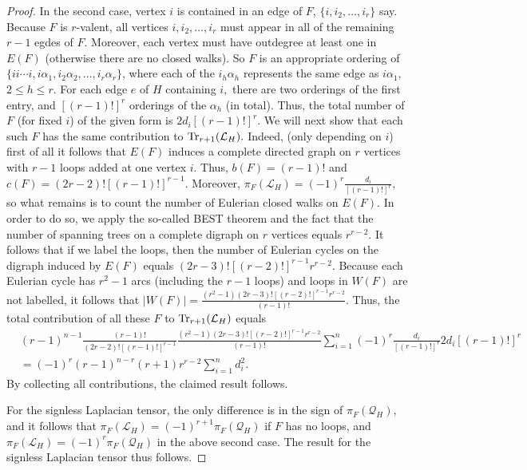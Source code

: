 \documentclass[11pt]{article}
\def\Tr{\mathop{\rm Tr }\nolimits}
\begin{document}
\begin{proof}
In the second case, vertex $i$ is contained in an edge of $F$, $\{i,i_{2},\ldots ,i_{r}\}$ say. Because $F$ is $r$-valent, all vertices $i,i_{2},\ldots ,i_{r}$ must appear in all of the remaining $r-1$ egdes of $F$. Moreover, each vertex must have outdegree at least one in $E(F)$ (otherwise there are no closed walks). So $F$ is an appropriate ordering of $\{ii\cdots i, i\alpha_{1}, i_{2}\alpha_{2}, \ldots, i_{r}\alpha_{r}\}$, where each of the $i_{h}\alpha_{h}$ represents the same edge as $i\alpha_{1}$, $2 \leq h \leq r.$ For each edge $e$ of $H$ containing $i,$ there are two orderings of the first entry, and $[(r-1)!]^{r}$ orderings of the $\alpha_{h}$ (in total). Thus, the total number of $F$ (for fixed $i$) of the given form is $2d_{i}[(r-1)!]^{r}.$ We will next show that each such $F$ has the same contribution to $\Tr_{r+1}(\mathcal{L}_{H}).$ Indeed, (only depending on $i$) first of all it follows that $E(F)$ induces a complete directed graph on $r$ vertices with $r-1$ loops added at one vertex $i.$ Thus, $b(F)=(r-1)!$ and $c(F)=(2r-2)![(r-1)!]^{r-1}.$ Moreover, $\pi_{F}(\mathcal{L}_{H})=(-1)^{r}\frac{d_{i}}{[(r-1)!]^{r}},$ so what remains is to count the number of Eulerian closed walks on $E(F)$. In order to do so, we apply the so-called BEST theorem \cite{AB} and the fact that the number of spanning trees on a complete digraph on $r$ vertices equals $r^{r-2}$. It follows that if we label the loops, then the number of Eulerian cycles on the digraph induced by $E(F)$ equals $(2r-3)![(r-2)!]^{r-1}r^{r-2}$. Because each Eulerian cycle has $r^{2}-1$ arcs (including the $r-1$ loops) and loops in $W(F)$ are not labelled, it follows that $\lvert W(F)\rvert=\frac{(r^{2}-1)(2r-3)![(r-2)!]^{r-1}r^{r-2}}{(r-1)!}.$ Thus, the total contribution of all these $F$ to $\Tr_{r+1}(\mathcal{L}_{H})$ equals
\begin{align*}
&(r-1)^{n-1}\tfrac{(r-1)!}{(2r-2)![(r-1)!]^{r-1}}\tfrac{(r^{2}-1)(2r-3)![(r-2)!]^{r-1}r^{r-2}}{(r-1)!}%
\sum_{i=1}^{n}(-1)^{r}\tfrac{d_{i}}{[(r-1)!]^{r}}2d_{i}[(r-1)!]^{r}
\\&=(-1)^{r}(r-1)^{n-r}(r+1)r^{r-2}\sum_{i=1}^{n}d_{i}^{2}.
\end{align*}
%
By collecting all contributions, the claimed result follows.

For the signless Laplacian tensor, the only difference is in the sign of $\pi_{F}(\mathcal{Q}_{H}),$ and it follows that $\pi_{F}(\mathcal{L}_{H})=(-1)^{r+1}\pi_{F}(\mathcal{Q}_{H})$ if $F$ has no loops, and $\pi_{F}(\mathcal{L}_{H})=(-1)^{r}\pi_{F}(\mathcal{Q}_{H})$ in the above second case. The result for the signless Laplacian tensor thus follows.
\end{proof}
\end{document}
